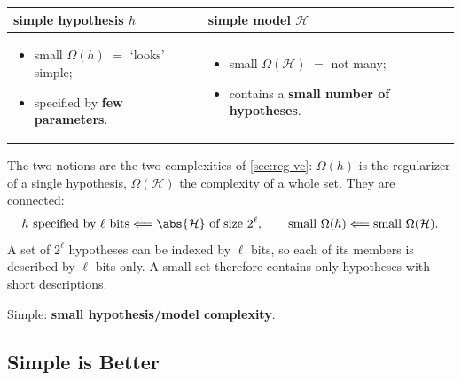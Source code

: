 \begin{center}
    \solidrules
    \begin{tabular}{p{}|p{}}
        \toprule
        \textbf{simple hypothesis} \(h\) & \textbf{simple model}
        \(\mathcal{H}\)\\
        \midrule
        \begin{itemize}[nosep, leftmargin=*, before=\vspace{-0.7\baselineskip}, after=\vspace{-\baselineskip}]
            \item small \(\Omega(h)\) \(=\) `looks' simple;
            \item specified by \textbf{few parameters}.
        \end{itemize}
        &
        \begin{itemize}[nosep, leftmargin=*, before=\vspace{-0.7\baselineskip}, after=\vspace{-\baselineskip}]
            \item small \(\Omega(\mathcal{H})\) \(=\) not many;
            \item contains a \textbf{small number of hypotheses}.
        \end{itemize}\\
        \bottomrule
    \end{tabular}
\end{center}

The two notions are the two complexities of \autoref{sec:reg-vc}:
\(\Omega(h)\) is the regularizer of a single hypothesis, \(\Omega(\mathcal{H})\)
the complexity of a whole set. They are connected:
\[
    h \text{ specified by } \ell \text{ bits} \Longleftarrow \abs{\mathcal{H}}
    \text{ of size } 2^\ell ,
    \qquad
    \text{small } \Omega(h) \Longleftarrow \text{small } \Omega(\mathcal{H}) .
\]
A set of \(2^\ell\) hypotheses can be indexed by \(\ell\) bits, so each of its
members is described by \(\ell\) bits only. A small set therefore contains
only hypotheses with short descriptions.

\begin{moral}
    Simple: \textbf{small hypothesis/model complexity}.
\end{moral}

\subsection{Simple is Better}

